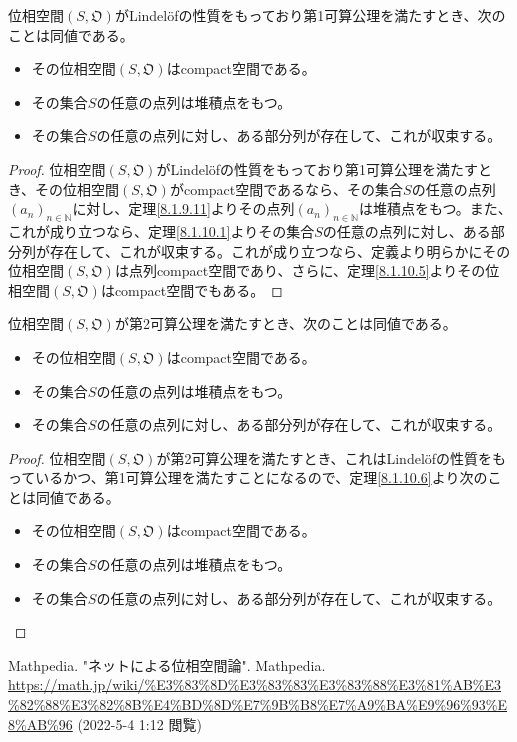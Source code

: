 \documentclass[dvipdfmx]{jsarticle}
\begin{document}
\begin{thm}\label{8.1.10.6}
位相空間$\left( S,\mathfrak{O} \right)$がLindelöfの性質をもっており第1可算公理を満たすとき、次のことは同値である。
\begin{itemize}
\item
  その位相空間$\left( S,\mathfrak{O} \right)$はcompact空間である。
\item
  その集合$S$の任意の点列は堆積点をもつ。
\item
  その集合$S$の任意の点列に対し、ある部分列が存在して、これが収束する。
\end{itemize}
\end{thm}
\begin{proof}
位相空間$\left( S,\mathfrak{O} \right)$がLindelöfの性質をもっており第1可算公理を満たすとき、その位相空間$\left( S,\mathfrak{O} \right)$がcompact空間であるなら、その集合$S$の任意の点列$\left( a_{n} \right)_{n \in \mathbb{N}}$に対し、定理\ref{8.1.9.11}よりその点列$\left( a_{n} \right)_{n \in \mathbb{N}}$は堆積点をもつ。また、これが成り立つなら、定理\ref{8.1.10.1}よりその集合$S$の任意の点列に対し、ある部分列が存在して、これが収束する。これが成り立つなら、定義より明らかにその位相空間$\left( S,\mathfrak{O} \right)$は点列compact空間であり、さらに、定理\ref{8.1.10.5}よりその位相空間$\left( S,\mathfrak{O} \right)$はcompact空間でもある。
\end{proof}
\begin{thm}\label{8.1.10.7}
位相空間$\left( S,\mathfrak{O} \right)$が第2可算公理を満たすとき、次のことは同値である。
\begin{itemize}
\item
  その位相空間$\left( S,\mathfrak{O} \right)$はcompact空間である。
\item
  その集合$S$の任意の点列は堆積点をもつ。
\item
  その集合$S$の任意の点列に対し、ある部分列が存在して、これが収束する。
\end{itemize}
\end{thm}
\begin{proof}
位相空間$\left( S,\mathfrak{O} \right)$が第2可算公理を満たすとき、これはLindelöfの性質をもっているかつ、第1可算公理を満たすことになるので、定理\ref{8.1.10.6}より次のことは同値である。
\begin{itemize}
\item
  その位相空間$\left( S,\mathfrak{O} \right)$はcompact空間である。
\item
  その集合$S$の任意の点列は堆積点をもつ。
\item
  その集合$S$の任意の点列に対し、ある部分列が存在して、これが収束する。
\end{itemize}
\end{proof}
\begin{thebibliography}{50}
  Mathpedia. "ネットによる位相空間論". Mathpedia. \url{https://math.jp/wiki/%E3%83%8D%E3%83%83%E3%83%88%E3%81%AB%E3%82%88%E3%82%8B%E4%BD%8D%E7%9B%B8%E7%A9%BA%E9%96%93%E8%AB%96} (2022-5-4 1:12 閲覧)
\end{thebibliography}
\end{document}
